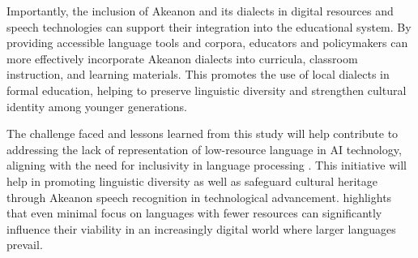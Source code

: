 Importantly, the inclusion of Akeanon and its dialects in digital resources and speech technologies can support their integration into the educational system. By providing accessible language tools and corpora, educators and policymakers can more effectively incorporate Akeanon dialects into curricula, classroom instruction, and learning materials. This promotes the use of local dialects in formal education, helping to preserve linguistic diversity and strengthen cultural identity among younger generations.

The challenge faced and lessons learned from this study will help contribute to addressing the lack of representation of low-resource language in AI technology, aligning with the need for inclusivity in language processing \cite{Poupard:2024}. This initiative will help in promoting linguistic diversity as well as safeguard cultural heritage through Akeanon speech recognition in technological advancement.  highlights that even minimal focus on languages with fewer resources can significantly influence their viability in an increasingly digital world where larger languages prevail.